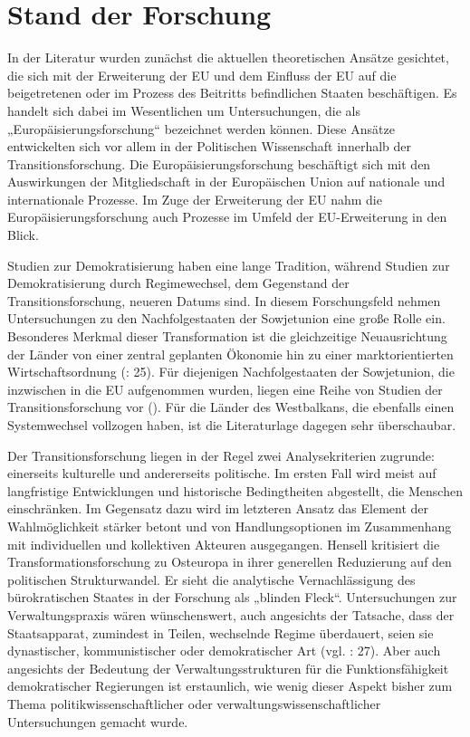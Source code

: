\section{Stand der Forschung}
In der Literatur wurden zunächst die aktuellen theoretischen Ansätze gesichtet, die sich mit der Erweiterung der EU und dem Einfluss der EU auf die beigetretenen oder im Prozess des Beitritts befindlichen Staaten beschäftigen. Es handelt sich dabei im Wesentlichen um Untersuchungen, die als „Europäisierungsforschung“ bezeichnet werden können. Diese Ansätze entwickelten sich vor allem in der Politischen Wissenschaft innerhalb der Transitionsforschung. Die Europäisierungsforschung beschäftigt sich mit den Auswirkungen der Mitgliedschaft in der Europäischen Union auf nationale und internationale Prozesse. Im Zuge der Erweiterung der EU nahm die Europäisierungsforschung auch Prozesse im Umfeld der EU-Erweiterung in den Blick.\par
Studien zur Demokratisierung haben eine lange Tradition, während Studien zur Demokratisierung durch Regimewechsel, dem Gegenstand der Transitionsforschung, neueren Datums sind. In diesem Forschungsfeld nehmen Untersuchungen zu den Nachfolgestaaten der Sowjetunion eine große Rolle ein. Besonderes Merkmal dieser Transformation ist die gleichzeitige Neuausrichtung der Länder von einer zentral geplanten Ökonomie hin zu einer marktorientierten Wirtschaftsordnung (\cite{diaman}: 25). Für diejenigen Nachfolgestaaten der Sowjetunion, die inzwischen in die EU aufgenommen wurden, liegen eine Reihe von Studien der Transitionsforschung vor (\cite{dimit02,linden,grab05,kneuer07}). Für die Länder des Westbalkans, die ebenfalls einen Systemwechsel vollzogen haben, ist die Literaturlage dagegen sehr überschaubar. 
\par
Der Transitionsforschung liegen in der Regel zwei Analysekriterien zugrunde: einerseits kulturelle und andererseits politische. Im ersten Fall wird meist auf langfristige Entwicklungen und historische Bedingtheiten abgestellt, die Menschen einschränken. Im Gegensatz dazu wird im letzteren Ansatz das Element der Wahlmöglichkeit stärker betont und von Handlungsoptionen im Zusammenhang mit individuellen und kollektiven Akteuren ausgegangen. Hensell kritisiert die Transformationsforschung zu Osteuropa in ihrer generellen Reduzierung auf den politischen Strukturwandel. Er sieht die analytische Vernachlässigung des bürokratischen Staates in der Forschung als „blinden Fleck“. Untersuchungen zur Verwaltungspraxis wären wünschenswert, auch angesichts der Tatsache, dass der Staatsapparat, zumindest in Teilen, wechselnde Regime überdauert, seien sie dynastischer, kommunistischer oder demokratischer Art (vgl. \cite{hens09}: 27). Aber auch angesichts der Bedeutung der Verwaltungsstrukturen für die Funktionsfähigkeit demokratischer Regierungen ist erstaunlich, wie wenig dieser Aspekt bisher zum Thema politikwissenschaftlicher oder verwaltungswissenschaftlicher Untersuchungen gemacht wurde.
